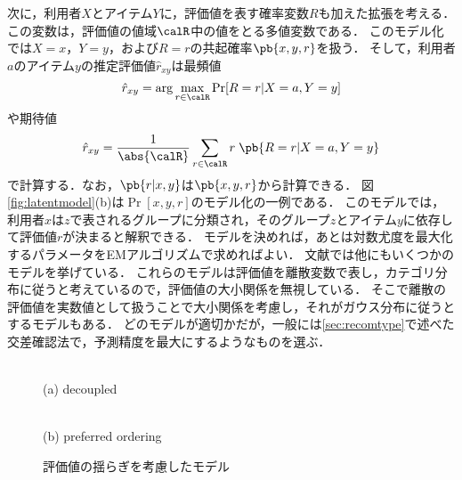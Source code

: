 次に，利用者$X$とアイテム$Y$に，評価値を表す確率変数$R$も加えた拡張を考える．
この変数は，評価値の値域$\calR$中の値をとる多値変数である．
このモデル化では$X=x$，$Y=y$，および$R=r$の共起確率$\pb{x,y,r}$を扱う．
そして，利用者$a$のアイテム$y$の推定評価値$\hat{r}_{xy}$は最頻値
\[
\hat{r}_{xy}=\arg\max_{r\in\calR}\Pr[R=r|X=a,Y=y]
\]
や期待値
\[
\hat{r}_{xy}=\frac{1}{\abs{\calR}}\sum_{r\in\calR}r\;\pb{R=r|X=a,Y=y}
\]
で計算する．なお，$\pb{r|x,y}$は$\pb{x,y,r}$から計算できる．
図\ref{fig:latentmodel}(b)は$\Pr[x,y,r]$のモデル化の一例である．
このモデルでは，利用者$x$は$z$で表されるグループに分類され，そのグループ$z$とアイテム$y$に依存して評価値$r$が決まると解釈できる．
モデルを決めれば，あとは対数尤度を最大化するパラメータをEMアルゴリズムで求めればよい．
文献\cite{ijcai:99:01}では他にもいくつかのモデルを挙げている．
これらのモデルは評価値を離散変数で表し，カテゴリ分布に従うと考えているので，評価値の大小関係を無視している．
そこで離散の評価値を実数値として扱うことで大小関係を考慮し，それがガウス分布に従うとするモデルもある\cite{sigir:03:01}．
どのモデルが適切かだが，一般には\ref{sec:recomtype}で述べた交差確認法で，予測精度を最大にするようなものを選ぶ．

\begin{figure}
\centering
\begin{minipage}[t]{0.3\fullwidth}
\centering
\setlength{\fboxsep}{0pt}
\\
(a) decoupled
\end{minipage}
\hspace{0.02\fullwidth}
\begin{minipage}[t]{0.3\fullwidth}
\centering
\setlength{\fboxsep}{0pt}
\\
(b) preferred ordering
\end{minipage}
\caption{評価値の揺らぎを考慮したモデル\cite{uai:03:01}}
\label{fig:decoupledmodel}
\end{figure}

